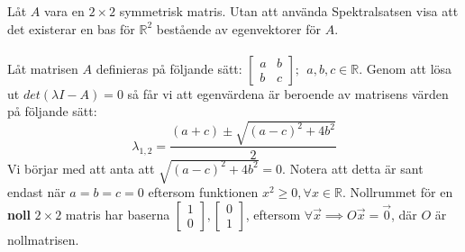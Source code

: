 \documentclass{report}
\begin{document}
{
	Låt $A$ vara en $2 \times 2$ symmetrisk matris. Utan att använda Spektralsatsen visa att det existerar en bas för $\mathbb{R}^2$ bestående av egenvektorer för $A$.\\\\
	
	Låt matrisen $A$ definieras på följande sätt: $
\begin{bmatrix}
	a & b\\
	b & c
\end{bmatrix};\:\:a,b,c \in \mathbb{R}$. Genom att lösa ut $det(\lambda I-A) = 0$ så får vi att egenvärdena är beroende av matrisens värden på följande sätt:
\begin{equation*}
	\lambda_{1,2} = \frac{(a+c)\pm\sqrt{(a-c)^2+4b^2}}{2}
\end{equation*}
Vi börjar med att anta att $\sqrt{(a-c)^2+4b^2} = 0$. Notera att detta är sant endast när $a = b = c = 0$ eftersom funktionen $x^2 \geq 0, \forall x \in \mathbb{R}$. Nollrummet för en \textbf{noll} $2 \times 2$ matris har baserna $
\begin{bmatrix}
	1\\
	0
\end{bmatrix},
\begin{bmatrix}
	0\\
	1
\end{bmatrix}$, eftersom $\forall \vec{x}\implies O\vec{x} = \vec{0}$, där $O$ är nollmatrisen.\\\\

}
\end{document}
